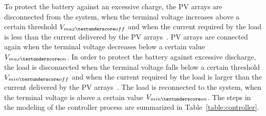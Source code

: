 \documentclass[review]{elsarticle}
\begin{document}
To protect the battery against an excessive charge, the PV arrays are disconnected from the system, when the terminal voltage increases above a certain threshold $V_{max \textunderscore off}$ and when the current required by the load is less than the current delivered by the PV arrays~\cite{Hansen}. PV arrays are connected again when the terminal voltage decreases below a certain value $ V_{max \textunderscore on} $. 
%
%
In order to protect the battery against excessive discharge, the load is disconnected when the terminal voltage falls below a certain threshold $V_{min \textunderscore off}$ and when the current required by the load is larger than the current delivered by the PV arrays~\cite{Hansen}. The load is reconnected to the system, when the terminal voltage is above a certain value $V_{min \textunderscore on}$.
%
%
%
The steps in the modeling of the controller process are summarized in Table~\ref{table:controller}.
\end{document}
